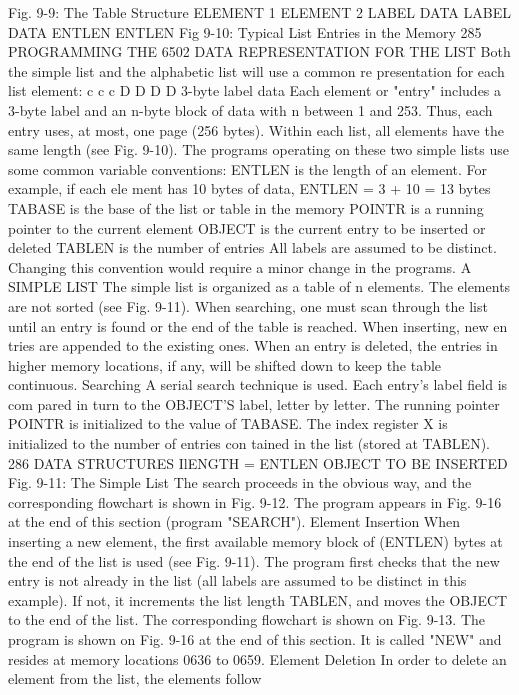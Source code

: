 \documentclass{book}
\begin{document}
{Fig. 9-9: The Table Structure
ELEMENT
1
ELEMENT
2
LABEL
DATA
LABEL
DATA
ENTLEN
ENTLEN
Fig 9-10: Typical List Entries in the Memory
285
PROGRAMMING THE 6502
DATA REPRESENTATION FOR THE LIST
Both the simple list and the alphabetic list will use a common re
presentation for each list element:
c c c D D D D
3-byte label data
Each element or "entry" includes a 3-byte label and an n-byte
block of data with n between 1 and 253. Thus, each entry uses, at
most, one page (256 bytes). Within each list, all elements have the
same length (see Fig. 9-10). The programs operating on these two
simple lists use some common variable conventions:
ENTLEN is the length of an element. For example, if each ele
ment has 10 bytes of data, ENTLEN = 3 + 10 = 13 bytes
TABASE is the base of the list or table in the memory
POINTR is a running pointer to the current element
OBJECT is the current entry to be inserted or deleted
TABLEN is the number of entries
All labels are assumed to be distinct. Changing this convention
would require a minor change in the programs.
A SIMPLE LIST
The simple list is organized as a table of n elements. The
elements are not sorted (see Fig. 9-11).
When searching, one must scan through the list until an entry is
found or the end of the table is reached. When inserting, new en
tries are appended to the existing ones. When an entry is deleted,
the entries in higher memory locations, if any, will be shifted down
to keep the table continuous.
Searching
A serial search technique is used. Each entry's label field is com
pared in turn to the OBJECT'S label, letter by letter.
The running pointer POINTR is initialized to the value of
TABASE.
The index register X is initialized to the number of entries con
tained in the list (stored at TABLEN).
286
DATA STRUCTURES
IlENGTH =
ENTLEN
OBJECT
TO BE INSERTED
Fig. 9-11: The Simple List
The search proceeds in the obvious way, and the corresponding
flowchart is shown in Fig. 9-12. The program appears in Fig.
9-16 at the end of this section (program "SEARCH").
Element Insertion
When inserting a new element, the first available memory block
of (ENTLEN) bytes at the end of the list is used (see Fig. 9-11).
The program first checks that the new entry is not already in the
list (all labels are assumed to be distinct in this example). If not, it
increments the list length TABLEN, and moves the OBJECT to
the end of the list. The corresponding flowchart is shown on Fig.
9-13.
The program is shown on Fig. 9-16 at the end of this section. It is
called "NEW" and resides at memory locations 0636 to 0659.
Element Deletion
In order to delete an element from the list, the elements follow
}
\end{document}
